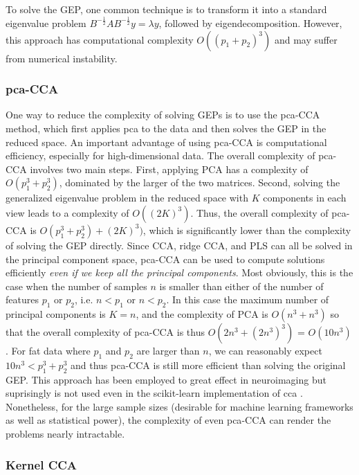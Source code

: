 To solve the GEP, one common technique is to transform it into a standard eigenvalue problem \( B^{-\frac{1}{2}} A B^{-\frac{1}{2}} y = \lambda y \), followed by eigendecomposition.
However, this approach has computational complexity \( O((p_1+p_2)^3) \) and may suffer from numerical instability.

\subsubsection{\acrshort{pca}-CCA}

One way to reduce the complexity of solving GEPs is to use the \acrshort{pca}-CCA method, which first applies \acrshort{pca} to the data and then solves the GEP in the reduced space.
An important advantage of using \acrshort{pca}-CCA is computational efficiency, especially for high-dimensional data.
The overall complexity of \acrshort{pca}-CCA involves two main steps.
First, applying PCA has a complexity of \( O(p_1^3+ p_2^3) \), dominated by the larger of the two matrices.
Second, solving the generalized eigenvalue problem in the reduced space with \( K \) components in each view leads to a complexity of \( O((2K)^3) \).
Thus, the overall complexity of \acrshort{pca}-CCA is \( O(p_1^3+ p_2^3) + (2K)^3) \), which is significantly lower than the complexity of solving the GEP directly.
Since CCA, ridge CCA, and PLS can all be solved in the principal component space, \acrshort{pca}-CCA can be used to compute solutions efficiently \textit{even if we keep all the principal components}.
Most obviously, this is the case when the number of samples \( n \) is smaller than either of the number of features \( p_1 \) or \( p_2 \), i.e. \( n < p_1 \) or \( n < p_2 \).
In this case the maximum number of principal components is \( K=n \), and the complexity of PCA is \( O(n^3+ n^3) \) so that the overall complexity of \acrshort{pca}-CCA is thus \( O(2n^3+(2n^3)^3) \) = \( O(10n^3) \).
For fat data where \( p_1 \) and \( p_2 \) are larger than \( n \), we can reasonably expect $10n^3<p_1^3+ p_2^3$ and thus \acrshort{pca}-CCA is still more efficient than solving the original GEP.
This approach has been employed to great effect in neuroimaging but suprisingly is not used even in the scikit-learn implementation of \acrshort{cca} \citep{pedregosa2011scikit}.
Nonetheless, for the large sample sizes (desirable for machine learning frameworks as well as statistical power), the complexity of even \acrshort{pca}-CCA can render the problems nearly intractable.

\subsubsection{Kernel CCA}

